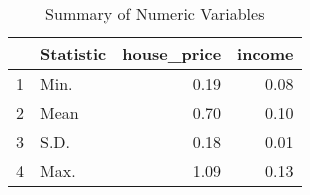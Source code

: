 \begin{table}[ht]
\centering
\begin{tabular}{rlrr}
  \hline
 & Statistic & house\_price & income \\ 
  \hline
1 & Min. & 0.19 & 0.08 \\ 
  2 & Mean & 0.70 & 0.10 \\ 
  3 & S.D. & 0.18 & 0.01 \\ 
  4 & Max. & 1.09 & 0.13 \\ 
   \hline
\end{tabular}
\caption{Summary of Numeric Variables} 
\label{tab:summary}
\end{table}
